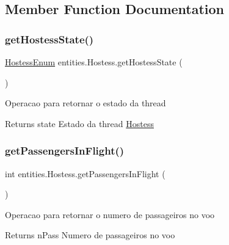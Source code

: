 \subsection{Member Function Documentation}
\mbox{\label{classentities_1_1_hostess_acee3f8042f80e5252e6ed73255117d4e}} 
\subsubsection{\texorpdfstring{get\+Hostess\+State()}{getHostessState()}}
{\footnotesize\ttfamily \hyperlink{enumentities_1_1_hostess_enum}{Hostess\+Enum} entities.\+Hostess.\+get\+Hostess\+State (\begin{DoxyParamCaption}{ }\end{DoxyParamCaption})\hspace{0.3cm}{\ttfamily [inline]}}

Operacao para retornar o estado da thread \begin{DoxyReturn}{Returns}
state Estado da thread \hyperlink{classentities_1_1_hostess}{Hostess} 
\end{DoxyReturn}
\mbox{\label{classentities_1_1_hostess_af9d14239c4536df5a3975700d4c853fb}} 
\subsubsection{\texorpdfstring{get\+Passengers\+In\+Flight()}{getPassengersInFlight()}}
{\footnotesize\ttfamily int entities.\+Hostess.\+get\+Passengers\+In\+Flight (\begin{DoxyParamCaption}{ }\end{DoxyParamCaption})\hspace{0.3cm}{\ttfamily [inline]}}

Operacao para retornar o numero de passageiros no voo \begin{DoxyReturn}{Returns}
n\+Pass Numero de passageiros no voo 
\end{DoxyReturn}
\mbox{\label{classentities_1_1_hostess_a509c1f1c96b0a760860884592c7babd8}} 
